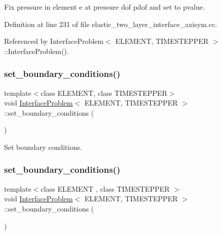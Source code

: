 Fix pressure in element e at pressure dof pdof and set to pvalue. 



Definition at line 231 of file elastic\+\_\+two\+\_\+layer\+\_\+interface\+\_\+axisym.\+cc.



Referenced by Interface\+Problem$<$ E\+L\+E\+M\+E\+N\+T, T\+I\+M\+E\+S\+T\+E\+P\+P\+E\+R $>$\+::\+Interface\+Problem().

\mbox{\label{classInterfaceProblem_a844445832ad7a32aa9f5d03ffdb40ebb}} 
\subsubsection{\texorpdfstring{set\+\_\+boundary\+\_\+conditions()}{set\_boundary\_conditions()}\hspace{0.1cm}{\footnotesize\ttfamily [1/2]}}
{\footnotesize\ttfamily template$<$class E\+L\+E\+M\+E\+NT, class T\+I\+M\+E\+S\+T\+E\+P\+P\+ER$>$ \\
void \hyperlink{classInterfaceProblem}{Interface\+Problem}$<$ E\+L\+E\+M\+E\+NT, T\+I\+M\+E\+S\+T\+E\+P\+P\+ER $>$\+::set\+\_\+boundary\+\_\+conditions (\begin{DoxyParamCaption}{ }\end{DoxyParamCaption})}



Set boundary conditions. 

\mbox{\label{classInterfaceProblem_a844445832ad7a32aa9f5d03ffdb40ebb}} 
\subsubsection{\texorpdfstring{set\+\_\+boundary\+\_\+conditions()}{set\_boundary\_conditions()}\hspace{0.1cm}{\footnotesize\ttfamily [2/2]}}
{\footnotesize\ttfamily template$<$class E\+L\+E\+M\+E\+NT , class T\+I\+M\+E\+S\+T\+E\+P\+P\+ER $>$ \\
void \hyperlink{classInterfaceProblem}{Interface\+Problem}$<$ E\+L\+E\+M\+E\+NT, T\+I\+M\+E\+S\+T\+E\+P\+P\+ER $>$\+::set\+\_\+boundary\+\_\+conditions (\begin{DoxyParamCaption}{ }\end{DoxyParamCaption})}



